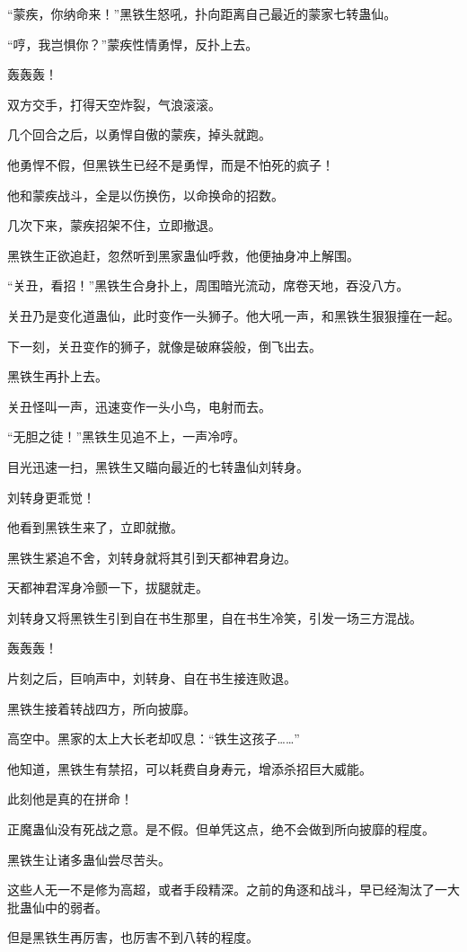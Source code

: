 \begin{this_body}
“蒙疾，你纳命来！”黑铁生怒吼，扑向距离自己最近的蒙家七转蛊仙。

“哼，我岂惧你？”蒙疾性情勇悍，反扑上去。

轰轰轰！

双方交手，打得天空炸裂，气浪滚滚。

几个回合之后，以勇悍自傲的蒙疾，掉头就跑。

他勇悍不假，但黑铁生已经不是勇悍，而是不怕死的疯子！

他和蒙疾战斗，全是以伤换伤，以命换命的招数。

几次下来，蒙疾招架不住，立即撤退。

黑铁生正欲追赶，忽然听到黑家蛊仙呼救，他便抽身冲上解围。

“关丑，看招！”黑铁生合身扑上，周围暗光流动，席卷天地，吞没八方。

关丑乃是变化道蛊仙，此时变作一头狮子。他大吼一声，和黑铁生狠狠撞在一起。

下一刻，关丑变作的狮子，就像是破麻袋般，倒飞出去。

黑铁生再扑上去。

关丑怪叫一声，迅速变作一头小鸟，电射而去。

“无胆之徒！”黑铁生见追不上，一声冷哼。

目光迅速一扫，黑铁生又瞄向最近的七转蛊仙刘转身。

刘转身更乖觉！

他看到黑铁生来了，立即就撤。

黑铁生紧追不舍，刘转身就将其引到天都神君身边。

天都神君浑身冷颤一下，拔腿就走。

刘转身又将黑铁生引到自在书生那里，自在书生冷笑，引发一场三方混战。

轰轰轰！

片刻之后，巨响声中，刘转身、自在书生接连败退。

黑铁生接着转战四方，所向披靡。

高空中。黑家的太上大长老却叹息：“铁生这孩子……”

他知道，黑铁生有禁招，可以耗费自身寿元，增添杀招巨大威能。

此刻他是真的在拼命！

正魔蛊仙没有死战之意。是不假。但单凭这点，绝不会做到所向披靡的程度。

黑铁生让诸多蛊仙尝尽苦头。

这些人无一不是修为高超，或者手段精深。之前的角逐和战斗，早已经淘汰了一大批蛊仙中的弱者。

但是黑铁生再厉害，也厉害不到八转的程度。


\end{this_body}
